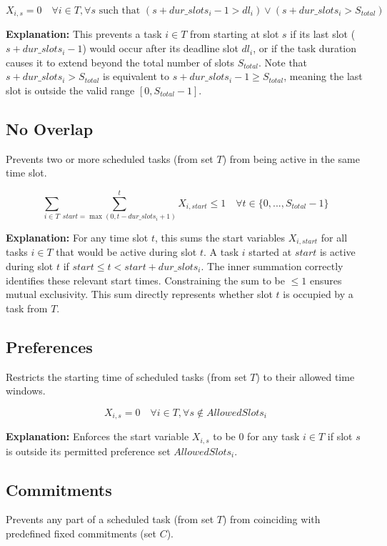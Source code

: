 \documentclass{article}
\begin{document}
\[
X_{i,s} = 0 \quad \forall i \in T, \forall s \text{ such that } (s + dur\_slots_i - 1 > dl_i) \lor (s + dur\_slots_i > S_{total})
\]

\textbf{Explanation:} This prevents a task $i \in T$ from starting at slot $s$ if its last slot ($s + dur\_slots_i - 1$) would occur after its deadline slot $dl_i$, or if the task duration causes it to extend beyond the total number of slots $S_{total}$. Note that $s + dur\_slots_i > S_{total}$ is equivalent to $s + dur\_slots_i - 1 \ge S_{total}$, meaning the last slot is outside the valid range $[0, S_{total}-1]$.

\subsection{No Overlap}
Prevents two or more scheduled tasks (from set $T$) from being active in the same time slot.

\begin{equation}
\sum_{i \in T} \sum_{start = \max(0, t - dur\_slots_i + 1)}^{t} X_{i,start} \le 1 \quad \forall t \in \{0, ..., S_{total}-1\} \label{eq:no_overlap}
\end{equation}

\textbf{Explanation:} For any time slot $t$, this sums the start variables $X_{i,start}$ for all tasks $i \in T$ that would be active during slot $t$. A task $i$ started at $start$ is active during slot $t$ if $start \le t < start + dur\_slots_i$. The inner summation correctly identifies these relevant start times. Constraining the sum to be $\le 1$ ensures mutual exclusivity. This sum directly represents whether slot $t$ is occupied by a task from $T$.

\subsection{Preferences}
Restricts the starting time of scheduled tasks (from set $T$) to their allowed time windows.

\[
X_{i,s} = 0 \quad \forall i \in T, \forall s \notin AllowedSlots_i
\]

\textbf{Explanation:} Enforces the start variable $X_{i,s}$ to be 0 for any task $i \in T$ if slot $s$ is outside its permitted preference set $AllowedSlots_i$.

\subsection{Commitments}
Prevents any part of a scheduled task (from set $T$) from coinciding with predefined fixed commitments (set $C$).
\end{document}
